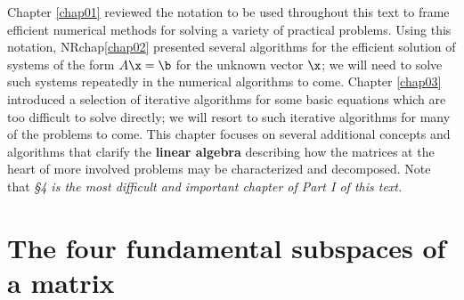  

Chapter \ref{chap01} reviewed the notation to be used throughout this text to frame efficient numerical methods for solving a variety of practical problems.
Using this notation, NRchap\ref{chap02} presented several algorithms for the efficient solution of systems of
the form $A\x = \b$ for the unknown vector $\x$; we will need to solve such systems repeatedly in the numerical algorithms to come.
Chapter \ref{chap03} introduced a selection of iterative algorithms for some basic equations which are too difficult to solve directly; we will resort to such iterative algorithms for many of the problems to come.
This chapter focuses on several additional concepts and algorithms that clarify the {\bf linear algebra} describing how the
matrices at the heart of more involved problems may be characterized and decomposed.
Note that {\it \S 4 is the most difficult and important chapter of Part I of this text.} 

\section{The four fundamental subspaces of a matrix}\label{sec.A.A.I}


